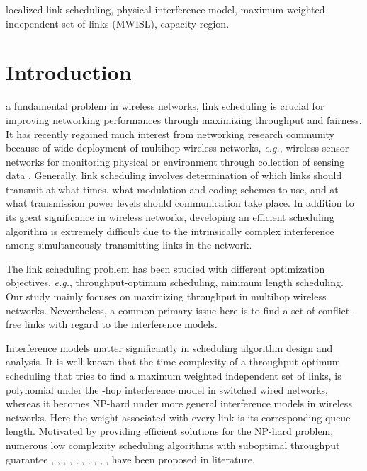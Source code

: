 \documentclass[journal]{IEEEtran}
\begin{document}
\begin{IEEEkeywords}
localized link scheduling, physical interference model, maximum weighted independent set of links (MWISL), capacity region.
\end{IEEEkeywords}

\IEEEpeerreviewmaketitle

\section{Introduction}

 a fundamental problem in wireless networks, link scheduling is crucial for improving  networking performances through maximizing throughput and fairness. It has recently regained much interest from networking research community because of wide deployment of multihop wireless networks, \emph{e.g.}, wireless sensor networks for monitoring physical or environment \cite{li2009underground} \cite{liu2010passive} through collection of sensing data \cite{S:effcient}.
Generally, link scheduling involves determination of which links should transmit at what times, what modulation and coding schemes to use, and at what transmission power levels should communication take place\cite{S:GMS}. In addition to its great significance in wireless networks, developing an efficient scheduling algorithm is extremely difficult due to the intrinsically complex interference among simultaneously transmitting links in the network.

The link scheduling problem has been studied with different optimization objectives, \emph{e.g.}, throughput-optimum scheduling, minimum length scheduling. Our study mainly focuses on maximizing throughput in multihop wireless networks. Nevertheless,  a common primary issue here is to find a set of conflict-free links with regard to the interference models.

Interference models matter significantly in scheduling algorithm design and analysis. It is well known that the time complexity of a throughput-optimum scheduling that tries to find a maximum weighted independent set of links, is polynomial under the -hop interference model in switched wired networks, whereas it becomes NP-hard under more general interference models in wireless networks\cite{S:GMS}. Here the weight associated with every link is its corresponding queue length. Motivated by providing efficient solutions for the NP-hard problem, numerous low complexity scheduling algorithms with suboptimal throughput guarantee \cite{S:MWM2}, \cite{S:GMS}, \cite{S:constant1}, \cite{S:constant2}, \cite{S:constant3}, \cite{S:constant4}, \cite{S:pick1}, \cite{S:pick2}, \cite{S:pick3}, \cite{S:MS}, have been proposed in literature.
\end{document}
